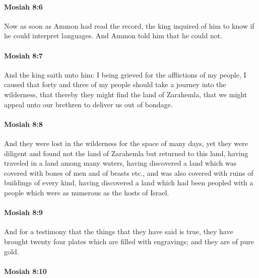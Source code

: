 		\paragraph{Mosiah 8:6} %
			\label{MOSIAH-8-6}

			Now as soon as Ammon had read the record,
			the king inquired of him to know if he could interpret languages.
			And Ammon told him that he could not.

		\paragraph{Mosiah 8:7} %
			\label{MOSIAH-8-7}

			And the king saith unto him:
			I being grieved for the afflictions of my people,
			I caused that forty and three of my people
			should take a journey into the wilderness,
			that thereby they might find the land of Zarahemla,
			that we might appeal unto our brethren to deliver us out of bondage.

		\paragraph{Mosiah 8:8} %
			\label{MOSIAH-8-8}

			And they were lost in the wilderness for the space of many days,
			yet they were diligent and found not the land of Zarahemla
			but returned to this land,
			having traveled in a land among many waters,
			having discovered a land which was covered with bones of men and of beasts etc.,
			and was also covered with ruins of buildings of every kind,
			having discovered a land which had been peopled with a people
			which were as numerous as the hosts of Israel.

		\paragraph{Mosiah 8:9} %
			\label{MOSIAH-8-9}

			And for a testimony that the things that they have said is true,
			they have brought twenty four plates which are filled with engravings;
			and they are of pure gold.

		\paragraph{Mosiah 8:10} %
			\label{MOSIAH-8-10}

